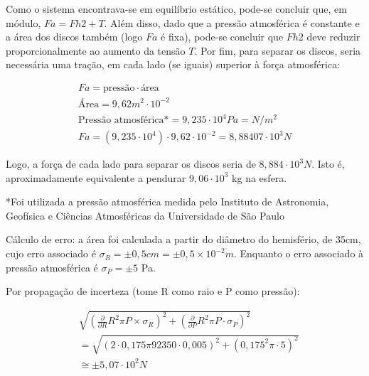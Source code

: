 
Como o sistema encontrava-se em equilíbrio estático, pode-se concluir que, em módulo, \(Fa = Fh2 + T\). Além disso, dado que a pressão atmosférica é constante e a área dos discos também (logo \(Fa\) é fixa), pode-se concluir que \(Fh2\) deve reduzir proporcionalmente ao aumento da tensão \(T\). Por fim, para separar os discos, seria necessária uma tração, em cada lado (se iguais) superior à força atmosférica:

\begin{align*}
    Fa = \text{pressão} \cdot\text{área}\\
    \text{Área} = 9,62 m^2 \cdot 10^{-2}\\
    \text{Pressão atmosférica*} = 9,235 \cdot 10^4 Pa = N/m^2\\
    Fa = (9,235 \cdot10^4) \cdot 9,62 \cdot 10^{-2} = 8,88407 \cdot 10^3 N  
\end{align*}

	Logo, a força de cada lado para separar os discos seria de \(8,884 \cdot 10^3 N\). Isto é, aproximadamente equivalente a pendurar \(9,06 \cdot10^3\) kg na esfera.
 
    *Foi utilizada a pressão atmosférica medida pelo Instituto de Astronomia, Geofísica e Ciências Atmosféricas da Universidade de São Paulo %

    
	Cálculo de erro: a área foi calculada a partir do diâmetro do hemisfério, de 35cm, cujo erro associado é \(\sigma_R = \pm0,5cm = \pm0,5\times10^{-2}m\). Enquanto o erro associado à pressão atmosférica é \(\sigma_P = \pm 5\) Pa.


	Por propagação de incerteza (tome R como raio e P como pressão):

\begin{align*}
&\sqrt{\left( \frac{\partial }{\partial R} R^{2}\pi P \times\sigma_R \right)^{2} + \left( \frac{\partial }{\partial P} R^{2}\pi P \cdot\sigma_P \right)^{2}}\\
&= \sqrt{\left( 2 \cdot 0,175 \pi 92350 \cdot 0,005 \right)^{2} + \left(0,175^{2}\pi \cdot 5 \right)^{2}} \\
&\cong  \pm 5,07 \cdot 10^2 N
\end{align*}

